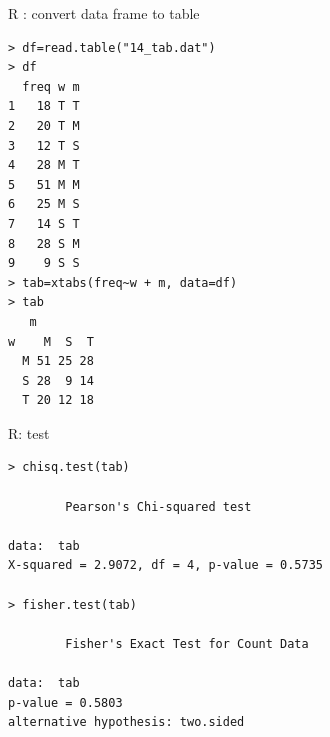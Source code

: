 \documentclass[smaller]{beamer}
\begin{document}
\begin{frame}[fragile]{R : convert data frame to table}
\begin{verbatim}
> df=read.table("14_tab.dat")
> df
  freq w m
1   18 T T
2   20 T M
3   12 T S
4   28 M T
5   51 M M
6   25 M S
7   14 S T
8   28 S M
9    9 S S
> tab=xtabs(freq~w + m, data=df) 
> tab
   m
w    M  S  T
  M 51 25 28
  S 28  9 14
  T 20 12 18
\end{verbatim}
\end{frame}


\begin{frame}[fragile]{R: test}
\begin{verbatim}
> chisq.test(tab)

        Pearson's Chi-squared test

data:  tab
X-squared = 2.9072, df = 4, p-value = 0.5735

> fisher.test(tab)

        Fisher's Exact Test for Count Data

data:  tab
p-value = 0.5803
alternative hypothesis: two.sided
\end{verbatim}
\end{frame}
\end{document}
